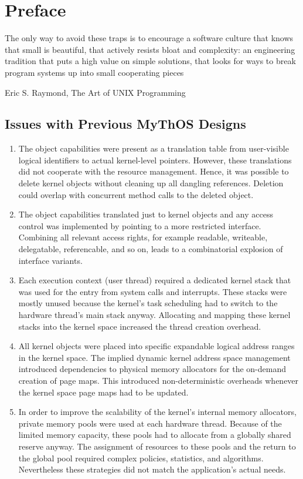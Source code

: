 \chapter{Preface}

\epigraph{The only way to avoid these traps is to encourage a software culture that knows that small is beautiful, that actively resists bloat and complexity: an engineering tradition that puts a high value on simple solutions, that looks for ways to break program systems up into small cooperating pieces}{Eric S. Raymond, The Art of UNIX Programming}


\section{Issues with Previous MyThOS Designs}

\begin{enumerate}[(1)]
\item The object capabilities were present as a translation table from user-visible logical identifiers to actual kernel-level pointers. However, these translations did not cooperate with the resource management. Hence, it was possible to delete kernel objects without cleaning up all dangling references. Deletion could overlap with concurrent method calls to the deleted object.
\item The object capabilities translated just to kernel objects and any access control was implemented by pointing to a more restricted interface. Combining all relevant access rights, for example readable, writeable, delegatable, referencable, and so on, leads to a combinatorial explosion of interface variants.
\item Each execution context (user thread) required a dedicated kernel stack that was used for the entry from system calls and interrupts. These stacks were mostly unused because the kernel's task scheduling had to switch to the hardware thread's main stack anyway. Allocating and mapping these kernel stacks into the kernel space increased the thread creation overhead. 
\item All kernel objects were placed into specific expandable logical address ranges in the kernel space. The implied dynamic kernel address space management introduced dependencies to physical memory allocators for the on-demand creation of page maps. This introduced non-deterministic overheads whenever the kernel space page maps had to be updated.
\item In order to improve the scalability of the kernel's internal memory allocators, private memory pools were used at each hardware thread. Because of the limited memory capacity, these pools had to allocate from a globally shared reserve anyway. The assignment of resources to these pools and the return to the global pool required complex policies, statistics, and algorithms. Nevertheless these strategies did not match the application's actual needs.

\end{enumerate}

